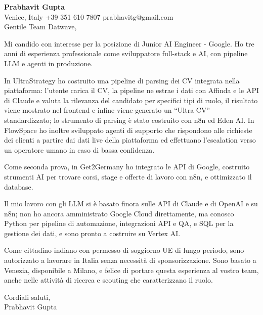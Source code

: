 \documentclass[a4paper,10.5pt]{article}
\begin{document}
\textbf{Prabhavit Gupta}\\
Venice, Italy \textbar{} +39 351 610 7807 \textbar{} prabhavitg@gmail.com\\[10pt]
Gentile Team Datwave,

Mi candido con interesse per la posizione di Junior AI Engineer - Google. Ho tre anni di esperienza professionale come sviluppatore full-stack e AI, con pipeline LLM e agenti in produzione.

In UltraStrategy ho costruito una pipeline di parsing dei CV integrata nella piattaforma: l'utente carica il CV, la pipeline ne estrae i dati con Affinda e le API di Claude e valuta la rilevanza del candidato per specifici tipi di ruolo, il risultato viene mostrato nel frontend e infine viene generato un ``Ultra CV'' standardizzato; lo strumento di parsing è stato costruito con n8n ed Eden AI. In FlowSpace ho inoltre sviluppato agenti di supporto che rispondono alle richieste dei clienti a partire dai dati live della piattaforma ed effettuano l'escalation verso un operatore umano in caso di bassa confidenza.

Come seconda prova, in Get2Germany ho integrato le API di Google, costruito strumenti AI per trovare corsi, stage e offerte di lavoro con n8n, e ottimizzato il database.

Il mio lavoro con gli LLM si è basato finora sulle API di Claude e di OpenAI e su n8n; non ho ancora amministrato Google Cloud direttamente, ma conosco Python per pipeline di automazione, integrazioni API e QA, e SQL per la gestione dei dati, e sono pronto a costruire su Vertex AI.

Come cittadino indiano con permesso di soggiorno UE di lungo periodo, sono autorizzato a lavorare in Italia senza necessità di sponsorizzazione. Sono basato a Venezia, disponibile a Milano, e felice di portare questa esperienza al vostro team, anche nelle attività di ricerca e scouting che caratterizzano il ruolo.

Cordiali saluti,\\
Prabhavit Gupta
\end{document}
